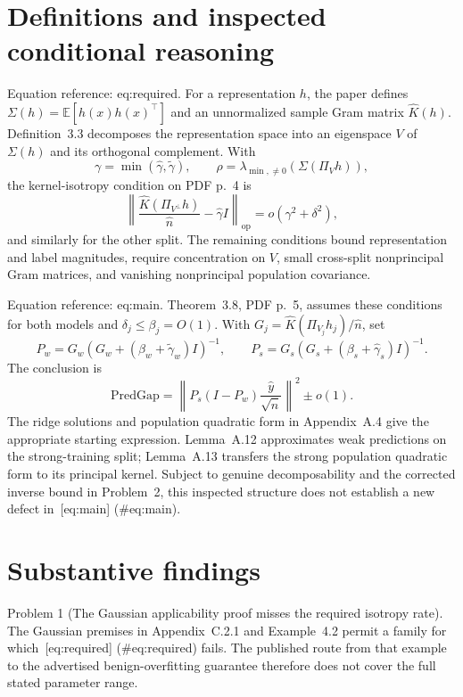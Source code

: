 \documentclass[10pt]{article}
\begin{document}
\section*{Definitions and inspected conditional reasoning}
Equation reference: eq:required. For a representation \(h\), the paper defines \(\Sigma(h)=\mathbb E[h(x)h(x)^\top]\) and an unnormalized sample Gram matrix \(\widehat K(h)\). Definition 3.3 decomposes the representation space into an eigenspace \(V\) of \(\Sigma(h)\) and its orthogonal complement. With \[\gamma=\min(\widehat\gamma,\widetilde\gamma),
 \qquad \rho=\lambda_{\min,\ne0}(\Sigma(\Pi_Vh)),\] the kernel-isotropy condition on PDF p. 4 is \[
 \left\|\frac{\widehat K(\Pi_{V^\perp}h)}{\widehat n}
       -\widehat\gamma I\right\|_{\mathrm{op}}
   =o(\gamma^2+\delta^2),\] and similarly for the other split. The remaining conditions bound representation and label magnitudes, require concentration on \(V\), small cross-split nonprincipal Gram matrices, and vanishing nonprincipal population covariance.\par
Equation reference: eq:main. Theorem 3.8, PDF p. 5, assumes these conditions for both models and \(\delta_j\le\beta_j=O(1)\). With \(G_j=\widehat K(\Pi_{V_j}h_j)/\widehat n\), set \[P_w=G_w(G_w+(\beta_w+\widetilde\gamma_w)I)^{-1},
 \qquad P_s=G_s(G_s+(\beta_s+\widehat\gamma_s)I)^{-1}.\] The conclusion is \[
 \mathrm{PredGap}=\left\|P_s(I-P_w)\frac{\widehat y}{\sqrt{\widehat n}}\right\|^2\pm o(1).\] The ridge solutions and population quadratic form in Appendix A.4 give the appropriate starting expression. Lemma A.12 approximates weak predictions on the strong-training split; Lemma A.13 transfers the strong population quadratic form to its principal kernel. Subject to genuine decomposability and the corrected inverse bound in Problem 2, this inspected structure does not establish a new defect in [eq:main] (\#eq:main).\par
\section*{Substantive findings}
Problem 1 (The Gaussian applicability proof misses the required isotropy rate).  The Gaussian premises in Appendix C.2.1 and Example 4.2 permit a family for which [eq:required] (\#eq:required) fails. The published route from that example to the advertised benign-overfitting guarantee therefore does not cover the full stated parameter range.\par
\end{document}
